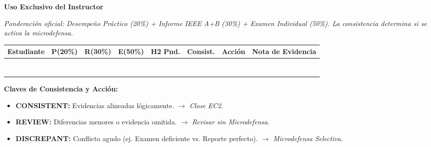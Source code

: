 \documentclass[11pt, a4paper]{article}
\begin{document}
\begin{tcolorbox}[colback=ucbblue!5!white, colframe=ucbblue, title=\textbf{Matriz de Reconciliación de Evidencias (Hito 2)}]
    \centering \textbf{Uso Exclusivo del Instructor}
\end{tcolorbox}

\noindent \textit{Ponderación oficial: Desempeño Práctico (20\%) + Informe IEEE A+B (30\%) + Examen Individual (50\%). La consistencia determina si se activa la microdefensa.}

\vspace{0.3cm}
\renewcommand{\arraystretch}{2}
\noindent
\begin{tabularx}{\textwidth}{
  >{\RaggedRight\arraybackslash\hsize=1.8\hsize}X 
  >{\centering\arraybackslash\hsize=0.6\hsize}X 
  >{\centering\arraybackslash\hsize=0.7\hsize}X 
  >{\centering\arraybackslash\hsize=0.7\hsize}X 
  >{\centering\arraybackslash\hsize=0.7\hsize}X 
  >{\centering\arraybackslash\hsize=0.8\hsize}X 
  >{\centering\arraybackslash\hsize=1.2\hsize}X 
  >{\RaggedRight\arraybackslash\hsize=1.5\hsize}X}
\toprule
\textbf{Estudiante} & \textbf{P(20\%)} & \textbf{R(30\%)} & \textbf{E(50\%)} & \textbf{H2 Pnd.} & \textbf{Consist.} & \textbf{Acción} & \textbf{Nota de Evidencia} \\ 
\midrule
 & & & & & & & \\ \midrule
 & & & & & & & \\ \midrule
 & & & & & & & \\ \midrule
 & & & & & & & \\ \midrule
 & & & & & & & \\ \midrule
 & & & & & & & \\ \midrule
 & & & & & & & \\ 
\bottomrule
\end{tabularx}

\vspace{0.5cm}
\textbf{Claves de Consistencia y Acción:}
\begin{itemize}
    \item \textbf{CONSISTENT:} Evidencias alineadas lógicamente. $\rightarrow$ \textit{Close EC2}.
    \item \textbf{REVIEW:} Diferencias menores o evidencia omitida. $\rightarrow$ \textit{Revisar sin Microdefensa}.
    \item \textbf{DISCREPANT:} Conflicto agudo (ej. Examen deficiente vs. Reporte perfecto). $\rightarrow$ \textit{Microdefensa Selectiva}.
\end{itemize}
\end{document}
